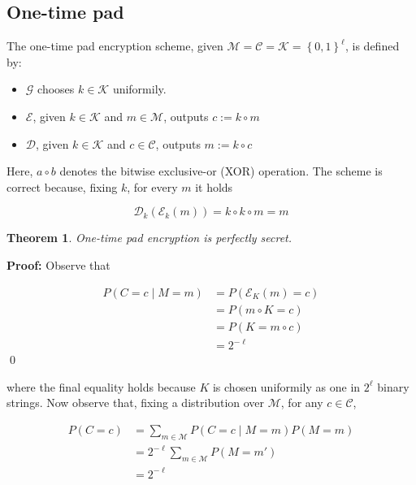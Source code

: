 \documentclass[a4paper, 12pt]{article}
\newtheorem{theorem}{Theorem}
\newtheorem{theorem}{Theorem}
\newenvironment{proof}[1][Proof]{\par\small\noindent\textbf{#1:} }{\qed\par\normalsize}
\begin{document}
\subsection{One-time pad}

The one-time pad encryption scheme, given $\mathcal{M} = \mathcal{C} =
\mathcal{K} = \left\{ 0, 1 \right\}^{\ell} $, is defined by: 

\begin{itemize}
    \item $\mathcal{G}$ chooses $k \in \mathcal{K}$ uniformily.
    \item $\mathcal{E}$, given $k \in \mathcal{K}$ and $m \in \mathcal{M}$,
        outputs $c := k \circ m$
    \item $\mathcal{D}$, given $k \in \mathcal{K}$ and $c \in \mathcal{C}$,
        outputs $m := k \circ c$
\end{itemize}

Here, $a \circ b$ denotes the bitwise exclusive-or (XOR) 
operation. The scheme is correct because, fixing $k$,
for every $m$ it holds 

\begin{equation*}
    \mathcal{D}_k \left( \mathcal{E}_k (m) \right) = k \circ k \circ m = m
\end{equation*}

\begin{theorem}
    One-time pad encryption is perfectly secret.
\end{theorem}

\begin{proof}
    Observe that 

    \begin{align*}
        P\left( C = c \mid M = m \right) &= P \left( \mathcal{E}_K(m) = c \right)  \\ 
                                         &= P\left( m \circ K = c \right)  \\ 
                                         &= P\left( K = m \circ c \right)  \\ 
                                         &= 2^{-\ell}
    \end{align*}
\end{proof}

where the final equality holds because $K$ is chosen uniformily as one 
in $2^{\ell}$ binary strings. Now observe that, fixing a distribution 
over $\mathcal{M}$, for any $c \in \mathcal{C}$,

\begin{align*}
    P\left( C = c \right)  &= \sum_{m \in \mathcal{M}} P\left( C = c \mid M = m \right) P\left( M = m \right)  \\ 
                           &= 2^{-\ell} \sum_{m \in \mathcal{M}} P(M = m')\\ 
                           &= 2^{-\ell}
\end{align*}
\end{document}
